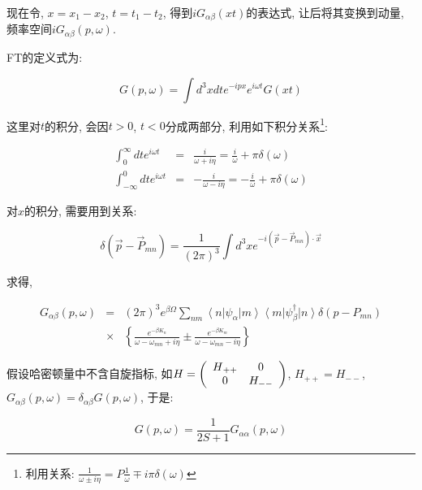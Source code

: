 现在令, $x=x_1 - x_2$, $t=t_1 - t_2$, 得到$iG_{\alpha
\beta}(xt)$的表达式, 让后将其变换到动量, 频率空间$iG_{\alpha
\beta}(p, \omega)$.

FT的定义式为:


\begin{equation*}
G(p, \omega) = \int d^3x dt e^{-ipx}e^{i \omega t} G(xt)
\end{equation*}


这里对$t$的积分, 会因$t>0$, $t<0$分成两部分,
利用如下积分关系\footnote{利用关系: $\frac{1}{\omega \pm i \eta } =
P \frac{1}{\omega} \mp i \pi \delta(\omega ) $}:

\begin{eqnarray*}
  \int_0^{\infty} dt e^{i \omega t} &=& \frac{i}{\omega + i \eta} = \frac{i}{\omega} + \pi \delta(\omega) \\
  \int_{-\infty}^0 dt e^{i \omega t} &=& - \frac{i}{\omega - i \eta}
  = - \frac{i}{\omega} + \pi \delta (\omega)
\end{eqnarray*}

对$x$的积分, 需要用到关系:

\begin{equation*}
\delta(  \vec p- \vec P_{mn}) =\frac{1}{(2\pi)^3} \int d^3 x e^{-i
(\vec p - \vec P_{mn})\cdot \vec x}
\end{equation*}

求得,


\begin{eqnarray*}
  G_{\alpha \beta} (p, \omega) &=& (2\pi)^3 e^{\beta \Omega} \sum_{nm}
\left\langle n \right| \psi_\alpha \left| m \right\rangle
\left\langle m \right| \psi_\beta^\dagger \left| n \right\rangle
\delta(p-P_{mn})  \\
{} & \times &   \left\{ \frac{e^{-\beta K_n}}{\omega - \omega_{mn} +
i \eta} \pm \frac{e^{-\beta K_m}}{\omega - \omega_{mn} - i \eta}
\right\}
\end{eqnarray*}

假设哈密顿量中不含自旋指标, 如$H = \left( {\begin{array}{*{20}c}
   {H{}_{ +  + }} & 0  \\
   0 & {H_{ -  - } }  \\
 \end{array} } \right)$, $H_{++} = H_{--}$, $G_{\alpha \beta}(p, \omega) = \delta_{\alpha \beta} G(p,
 \omega)$, 于是:

 \begin{equation*}
 G(p,\omega) = \frac{1}{2S+1} G_{\alpha \alpha} (p, \omega)
 \end{equation*}


